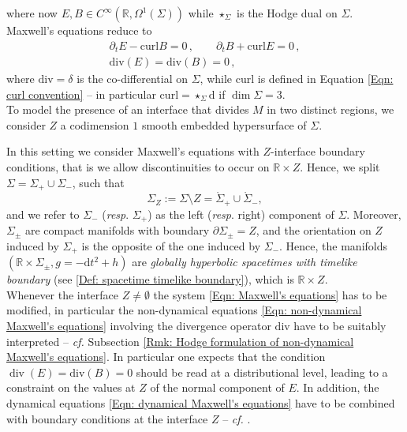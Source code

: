 where now $E,B\in C^\infty(\mathbb{R},\Omega^1(\Sigma))$ while $\star_\Sigma$ is the Hodge dual on $\Sigma$.
\noindent Maxwell's equations reduce to
\begin{subequations}\label{Eqn: Maxwell's equations}
	\begin{align}
	\label{Eqn: dynamical Maxwell's equations}
	\partial_tE-\mathrm{curl}B=0\,,\qquad
	\partial_tB+\mathrm{curl}E=0\,,\\
	\label{Eqn: non-dynamical Maxwell's equations}
	\mathrm{div}(E)=\mathrm{div}(B)=0\,,
	\end{align}
\end{subequations}
where $\mathrm{div}=\delta$ is the co-differential on $\Sigma$, while $\mathrm{curl}$ is defined in Equation \eqref{Eqn: curl convention} -- in particular $\mathrm{curl}=\star_\Sigma\mathrm{d}$ if $\dim\Sigma=3$.\\
To model the presence of an interface that divides $M$ in two distinct regions, we consider $Z$ a codimension $1$ smooth embedded hypersurface of $\Sigma$.

In this setting we consider Maxwell's equations with $Z$-interface boundary conditions, that is we allow discontinuities to occur on $\mathbb{R}\times Z$.
Hence, we split $\Sigma=\Sigma_+\cup\Sigma_-$, such that
\begin{equation}\label{Eqn: Sigma Z splitting}
	 \Sigma_Z:=\Sigma\setminus Z=\mathring{\Sigma}_+\cup\mathring{\Sigma}_-,
\end{equation} and we refer to $\Sigma_-$ (\textit{resp}. $\Sigma_+$) as the left (\textit{resp}. right) component of $\Sigma$.
Moreover, $\Sigma_\pm$ are compact manifolds with boundary $\partial \Sigma_\pm= Z$, and the orientation on $Z$ induced by $\Sigma_+$ is the opposite of the one induced by $\Sigma_-$.
Hence, the manifolds $(\mathbb{R}\times\Sigma_\pm,g=-\mathrm{d}t^2+h)$ are \emph{globally hyperbolic spacetimes with timelike boundary} (see \ref{Def: spacetime timelike boundary}), which is $\mathbb{R}\times Z$.\\

Whenever the interface $Z\neq\emptyset$ the system \eqref{Eqn: Maxwell's equations} has to be modified, in particular the non-dynamical equations \eqref{Eqn: non-dynamical Maxwell's equations} involving the divergence operator $\mathrm{div}$ have to be suitably interpreted -- \textit{cf.} Subsection \ref{Rmk: Hodge formulation of non-dynamical Maxwell's equations}.
In particular one expects that the condition $\operatorname{div}(E)=\mathrm{div}(B)=0$ should be read at a distributional level, leading to a constraint on the values at $Z$ of the normal component of $E$.
In addition, the dynamical equations \eqref{Eqn: dynamical Maxwell's equations} have to be combined with boundary conditions at the interface $Z$ -- \textit{cf.} \parencite[Sec. I.5]{Jackson-99}.

